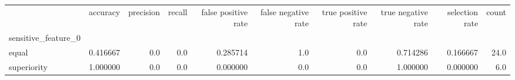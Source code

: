 \begin{tabular}{lrrrrrrrrr}
\toprule
{} &  accuracy &  precision &  recall &  false positive rate &  false negative rate &  true positive rate &  true negative rate &  selection rate &  count \\
sensitive\_feature\_0 &           &            &         &                      &                      &                     &                     &                 &        \\
\midrule
equal               &  0.416667 &        0.0 &     0.0 &             0.285714 &                  1.0 &                 0.0 &            0.714286 &        0.166667 &   24.0 \\
superiority         &  1.000000 &        0.0 &     0.0 &             0.000000 &                  0.0 &                 0.0 &            1.000000 &        0.000000 &    6.0 \\
\bottomrule
\end{tabular}
